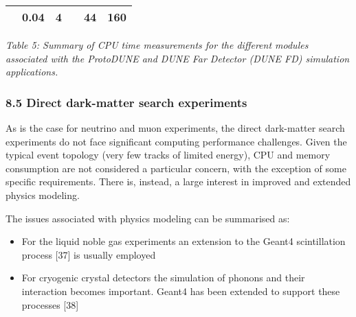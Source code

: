 \documentclass[12pt,a4paper]{article}
\begin{document}
\begin{longtable}[]{@{}llllll@{}}
\begin{minipage}[t]{0.14\columnwidth}
\end{minipage} & \begin{minipage}[t]{0.14\columnwidth}\raggedright
0.04\strut
\end{minipage} & \begin{minipage}[t]{0.14\columnwidth}\raggedright
4\strut
\end{minipage} & \begin{minipage}[t]{0.14\columnwidth}\raggedright
\strut
\end{minipage} & \begin{minipage}[t]{0.14\columnwidth}\raggedright
44\strut
\end{minipage} & \begin{minipage}[t]{0.14\columnwidth}\raggedright
160\strut
\end{minipage}\tabularnewline
\bottomrule
\end{longtable}

\emph{Table 5: Summary of CPU time measurements for the different
modules associated with the ProtoDUNE and DUNE Far Detector (DUNE FD)
simulation applications.}

\hypertarget{section-4}{%
\subsubsection{}\label{section-4}}

\hypertarget{direct-dark-matter-search-experiments}{%
\subsubsection{8.5 Direct dark-matter search
experiments}\label{direct-dark-matter-search-experiments}}

As is the case for neutrino and muon experiments, the direct dark-matter
search experiments do not face significant computing performance
challenges. Given the typical event topology (very few tracks of limited
energy), CPU and memory consumption are not considered a particular
concern, with the exception of some specific requirements. There is,
instead, a large interest in improved and extended physics modeling.

The issues associated with physics modeling can be summarised as:

\begin{itemize}
\item
  For the liquid noble gas experiments an extension to the Geant4
  scintillation process {[}37{]} is usually employed
\item
  For cryogenic crystal detectors the simulation of phonons and their
  interaction becomes important. Geant4 has been extended to support
  these processes {[}38{]}
\end{itemize}
\end{document}
